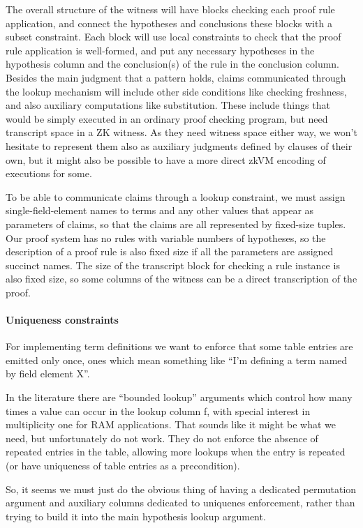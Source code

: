 \documentclass{article}
\theoremstyle{plain}
\theoremstyle{definition}
\begin{document}
The overall structure of the witness will have blocks checking each
proof rule application, and connect the hypotheses and conclusions these
blocks with a subset constraint. Each block will use local constraints
to check that the proof rule application is well-formed, and put any
necessary hypotheses in the hypothesis column and the conclusion(s) of
the rule in the conclusion column. Besides the main judgment that a
pattern holds, claims communicated through the lookup mechanism will
include other side conditions like checking freshness, and also
auxiliary computations like substitution. These include things that
would be simply executed in an ordinary proof checking program, but need
transcript space in a ZK witness. As they need witness space either way,
we won't hesitate to represent them also as auxiliary judgments defined
by clauses of their own, but it might also be possible to have a more
direct zkVM encoding of executions for some.

To be able to communicate claims through a lookup constraint, we must
assign single-field-element names to terms and any other values that
appear as parameters of claims, so that the claims are all represented
by fixed-size tuples. Our proof system has no rules with variable
numbers of hypotheses, so the description of a proof rule is also fixed
size if all the parameters are assigned succinct names. The size of the
transcript block for checking a rule instance is also fixed size, so
some columns of the witness can be a direct transcription of the proof.

\paragraph{Uniqueness constraints}\label{uniqueness-constraints}

For implementing term definitions we want to enforce that some table
entries are emitted only once, ones which mean something like ``I'm
defining a term named by field element X''.

In the literature there are ``bounded lookup'' arguments which control
how many times a value can occur in the lookup column f, with special
interest in multiplicity one for RAM applications. That sounds like it
might be what we need, but unfortunately do not work. They do not
enforce the absence of repeated entries in the table, allowing
more lookups when the entry is repeated (or have uniqueness of table
entries as a precondition).

So, it seems we must just do the obvious thing of having a dedicated
permutation argument and auxiliary columns dedicated to uniquenes
enforcement, rather than trying to build it into the main hypothesis
lookup argument.
\end{document}
